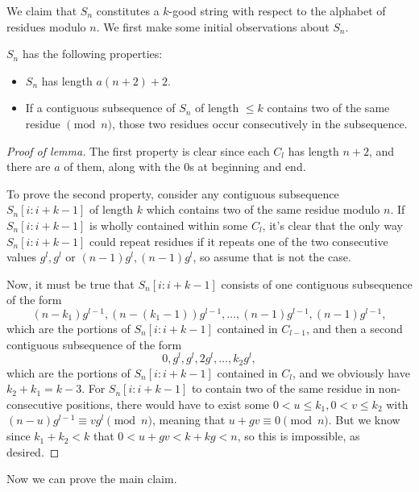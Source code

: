 \documentclass[11pt]{scrartcl}
\begin{document}
 We claim that $S_n$ constitutes a $k$-good string with respect to the alphabet of residues modulo $n$. We first make some initial observations about $S_n$.

\begin{lemma*}
  $S_n$ has the following properties:
  \begin{itemize}
    \item $S_n$ has length $a(n+2)+2$.
    \item If a contiguous subsequence of $S_n$ of length $\le k$ contains two of the same residue $\pmod n$, those two residues occur consecutively in the subsequence.
  \end{itemize}
\end{lemma*}
\begin{proof}
  [Proof of lemma]
  The first property is clear since each $C_l$ has length $n+2$, and there are $a$ of them, along with the $0$s at beginning and end.

  To prove the second property, consider any contiguous subsequence $S_n[i:i+k-1]$ of length $k$ which contains two of the same residue modulo $n$. If $S_n [i:i+k-1]$ is wholly contained within some $C_l$, it's clear that the only way $S_n[i:i+k-1]$ could repeat residues if it repeats one of the two consecutive values $g^l,g^l$ or $(n-1)g^l, (n-1)g^l$, so assume that is not the case.

  Now, it must be true that $S_n[i:i+k-1]$ consists of one contiguous subsequence of the form \[(n-k_1)g^{l-1}, (n-(k_1-1))g^{l-1}, \dots, (n-1)g^{l-1}, (n-1)g^{l-1},\] which are the portions of $S_n[i:i+k-1]$ contained in $C_{l-1}$, and then a second contiguous subsequence of the form \[0, g^l, g^l, 2g^l, \dots, k_2g^l,\] which are the portions of $S_n[i:i+k-1]$ contained in $C_l$, and we obviously have $k_2+k_1=k-3$. For $S_n[i:i+k-1]$ to contain two of the same residue in non-consecutive positions, there would have to exist some $0<u \le k_1, 0<v\le k_2$ with $(n-u)g^{l-1} \equiv vg^l \pmod n$, meaning that $u + gv \equiv 0\pmod n$. But we know since $k_1 + k_2 < k$ that $ 0 < u +gv < k+kg < n$, so this is impossible, as desired.
\end{proof}
Now we can prove the main claim.
\end{document}
